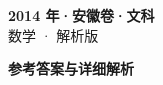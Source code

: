\documentclass[zihao=-4, a4paper]{ctexart}
\begin{document}
\begin{center}
  {\Large\bfseries 2014 年·安徽卷·文科}\\[4pt]
  {\large 数学 · 解析版}
\end{center}
\medskip
{}

\clearpage
{}
\begin{center}{\Large\bfseries 参考答案与详细解析}\end{center}
\medskip

\end{document}
